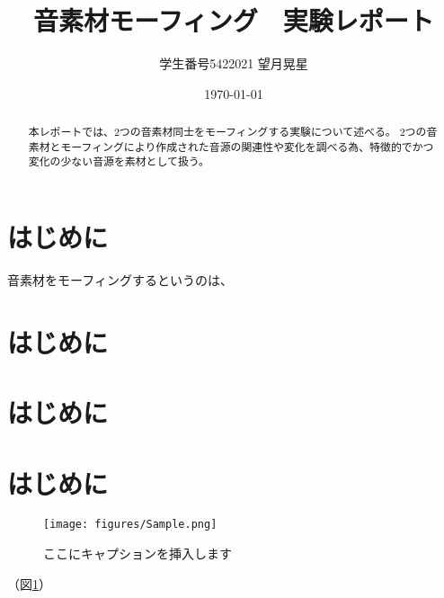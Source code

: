 \documentclass[platex,dvipdfmx]{jlreq}			%
\title{音素材モーフィング　実験レポート}
\author{学生番号5422021 望月晃星}
\date{\today}
\begin{document}
\maketitle

\begin{abstract}%
本レポートでは、2つの音素材同士をモーフィングする実験について述べる。
2つの音素材とモーフィングにより作成された音源の関連性や変化を調べる為、特徴的でかつ変化の少ない音源を素材として扱う。
\end{abstract}

\section{はじめに}
音素材をモーフィングするというのは、

\section{はじめに}
\section{はじめに}
\section{はじめに}

\begin{figure}
\centering
\texttt{[image: figures/Sample.png]}
\caption{ここにキャプションを挿入します}
\label{fig:model}
\end{figure}

（図\ref{fig:model}）
\end{document}
